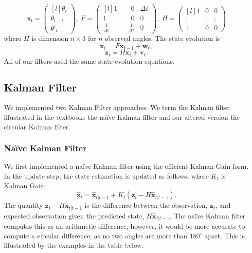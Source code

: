 \documentclass[11pt]{amsart}
\begin{document}
\[\mathbf{x}_t = \begin{pmatrix*}[l]
    \theta_t \\
    \theta_{t-1} \\
    \theta'_t
\end{pmatrix*},\;  
F = \begin{pmatrix*}[l]
    1 & \phantom{-}0 & \Delta t \\
    1 & \phantom{-}0 & 0 \\
    \frac{1}{\Delta t} & -\frac{1}{\Delta t} & 0
\end{pmatrix*},\;
H = \begin{pmatrix*}[l]
    1 & 0 & 0 \\
    \vdots & \vdots & \vdots\\
    1 & 0 & 0

\end{pmatrix*}\]
 where $H$ is dimension $n\times3$ for $n$ observed angles. The state evolution is
 \[\mathbf{x}_t = F\mathbf{x}_{t-1} + \mathbf{w}_t,\]
\[\mathbf{z}_t = H\mathbf{x}_t + \mathbf{v}_t.\]
All of our filters used the same state evolution equations.

\subsection{Kalman Filter}
We implemented two Kalman Filter \cite{V3}\cite{V3 Lab Manual} approaches. We term the Kalman filter illustrated in the textbooks the naïve Kalman filter and our altered version the circular Kalman filter.

\subsubsection{Naïve Kalman Filter}
We first implemented a naïve Kalman filter using the efficient Kalman Gain form. In the update step, the state estimation is updated as follows, where $K_t$ is Kalman Gain: \[\mathbf{\hat{x}}_t = \mathbf{\hat{x}}_{t|t-1} + K_t(\mathbf{z}_t - H\mathbf{\hat{x}}_{t|t-1}).\] The quantity $\mathbf{z}_t - H\mathbf{\hat{x}}_{t|t-1}$ is the difference between the observation, $\mathbf{z}_t$, and expected observation given the predicted state, $H\mathbf{\hat{x}}_{t|t-1}$. The naïve Kalman filter computes this as an arithmetic difference, however, it would be more accurate to compute a circular difference, as no two angles are more than $180^{\circ}$ apart. This is illustraded by the examples in the table below:
\end{document}
